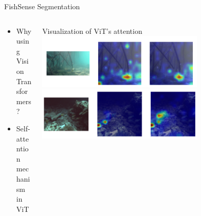 \begin{frame}{FishSense Segmentation}
    \begin{columns}
        \begin{column}{0.5\textwidth}
            \begin{itemize}
                \item Why using Vision Transformers?
                \item Self-attention mechanism in ViT
            \end{itemize}
        \end{column}
        \begin{column}{0.5\textwidth}
            Visualization of ViT's attention
            \includegraphics[height=0.7\textheight,width=0.7\textwidth,keepaspectratio]{images/fs_seg_vit_1.png}
            \includegraphics[height=0.7\textheight,width=0.7\textwidth,keepaspectratio]{images/fs_seg_vit_2.png}
        \end{column}
    \end{columns}


\end{frame}

